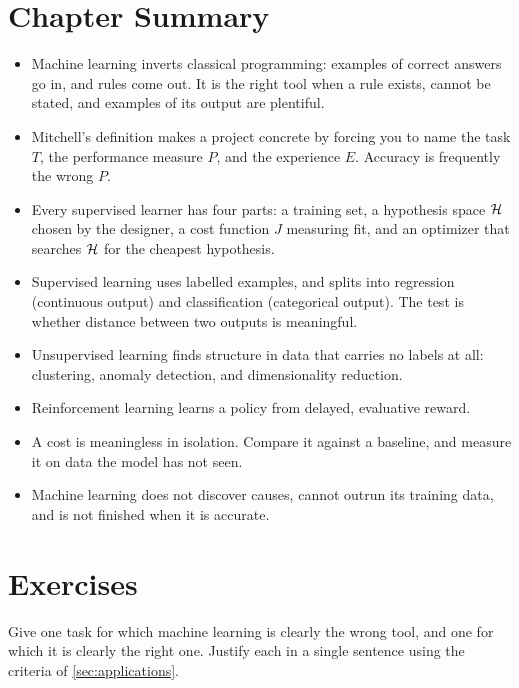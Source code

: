 \section*{Chapter Summary}

\begin{itemize}
  \item Machine learning inverts classical programming: examples of correct
        answers go in, and rules come out. It is the right tool when a rule
        exists, cannot be stated, and examples of its output are plentiful.
  \item Mitchell's definition makes a project concrete by forcing you to name
        the task $T$, the performance measure $P$, and the experience $E$.
        Accuracy is frequently the wrong $P$.
  \item Every supervised learner has four parts: a training set, a hypothesis
        space $\mathcal{H}$ chosen by the designer, a cost function $J$ measuring
        fit, and an optimizer that searches $\mathcal{H}$ for the cheapest
        hypothesis.
  \item Supervised learning uses labelled examples, and splits into regression
        (continuous output) and classification (categorical output). The test
        is whether distance between two outputs is meaningful.
  \item Unsupervised learning finds structure in data that carries no labels
        at all: clustering, anomaly detection, and dimensionality reduction.
  \item Reinforcement learning learns a policy from delayed, evaluative reward.
  \item A cost is meaningless in isolation. Compare it against a baseline, and
        measure it on data the model has not seen.
  \item Machine learning does not discover causes, cannot outrun its training
        data, and is not finished when it is accurate.
\end{itemize}

\section*{Exercises}


\sq Give one task for which machine learning is clearly the wrong tool, and one
for which it is clearly the right one. Justify each in a single sentence using
the criteria of \cref{sec:applications}.

